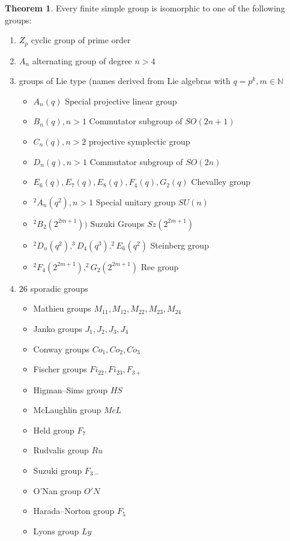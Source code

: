\documentclass[10pt,a4paper]{article}
\theoremstyle{definition}
\newtheorem{theorem}{Theorem}[section]
\begin{document}
\begin{theorem}
Every finite simple group is isomorphic to one of the following groups:
\begin{enumerate}
    \item $Z_p$ cyclic group of prime order
    \item $A_n$ alternating group of degree $n>4$
    \item groups of Lie type (names derived from Lie algebras with $q=p^k, m\in\mathbb{N}$
    \begin{itemize}
        \item $A_n(q)$ Special projective linear group
        \item $B_n(q), n>1$ Commutator subgroup of $SO(2n+1)$ 
        \item $C_n(q), n>2$ projective symplectic group
        \item $D_n(q), n>1$ Commutator subgroup of $SO(2n)$ 
        \item $E_6(q), E_7(q), E_8(q), F_4(q), G_2(q)$ Chevalley group
        \item $^2A_n(q^2), n>1$ Special unitary group $SU(n)$
        \item $^2B_2(2^{2m+1}))$ Suzuki Groups $Sz(2^{2m+1})$
        \item $^2D_n(q^2), ^3D_4(q^3), ^2E_6(q^2)$ Steinberg group
        \item $^2F_4(2^{2m+1}), ^2G_2(2^{2m+1})$ Ree group
    \end{itemize}
    \item 26 sporadic groups
    \begin{itemize}
        \item Mathieu groups $M_{11}, M_{12}, M_{22}, M_{23}, M_{24}$
        \item Janko groups $J_1, J_2, J_3, J_4$
        \item Conway groups $Co_1, Co_2, Co_3$
        \item Fischer groups $Fi_{22}, Fi_{23}, F_{3+}$
        \item Higman–Sims group $HS$
        \item McLaughlin group $McL$
        \item Held group $F_7$
        \item Rudvalis group $Ru$
        \item Suzuki group $F_{3-}$
        \item O'Nan group $O'N$
        \item Harada–Norton group $F_5$
        \item Lyons group $Ly$

\end{itemize}
\end{enumerate}
\end{theorem}
\end{document}
